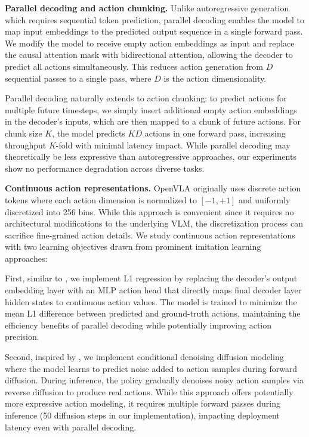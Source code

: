 \documentclass[conference]{IEEEtran}
\begin{document}
\textbf{Parallel decoding and action chunking.} Unlike autoregressive generation which requires sequential token prediction, parallel decoding enables the model to map input embeddings to the predicted output sequence in a single forward pass. We modify the model to receive empty action embeddings as input and replace the causal attention mask with bidirectional attention, allowing the decoder to predict all actions simultaneously. This reduces action generation from $D$ sequential passes to a single pass, where $D$ is the action dimensionality.

Parallel decoding naturally extends to action chunking: to predict actions for multiple future timesteps, we simply insert additional empty action embeddings in the decoder's inputs, which are then mapped to a chunk of future actions. For chunk size $K$, the model predicts $KD$ actions in one forward pass, increasing throughput $K$-fold with minimal latency impact. While parallel decoding may theoretically be less expressive than autoregressive approaches, our experiments show no performance degradation across diverse tasks.

\textbf{Continuous action representations.} OpenVLA originally uses discrete action tokens where each action dimension is normalized to $[-1,+1]$ and uniformly discretized into 256 bins. While this approach is convenient since it requires no architectural modifications to the underlying VLM, the discretization process can sacrifice fine-grained action details. We study continuous action representations with two learning objectives drawn from prominent imitation learning approaches:

First, similar to \citet{zhao2023learning}, we implement L1 regression by replacing the decoder's output embedding layer with an MLP action head that directly maps final decoder layer hidden states to continuous action values. The model is trained to minimize the mean L1 difference between predicted and ground-truth actions, maintaining the efficiency benefits of parallel decoding while potentially improving action precision.

Second, inspired by \citet{chi2023diffusion}, we implement conditional denoising diffusion modeling where the model learns to predict noise added to action samples during forward diffusion. During inference, the policy gradually denoises noisy action samples via reverse diffusion to produce real actions. While this approach offers potentially more expressive action modeling, it requires multiple forward passes during inference (50 diffusion steps in our implementation), impacting deployment latency even with parallel decoding.
\end{document}
